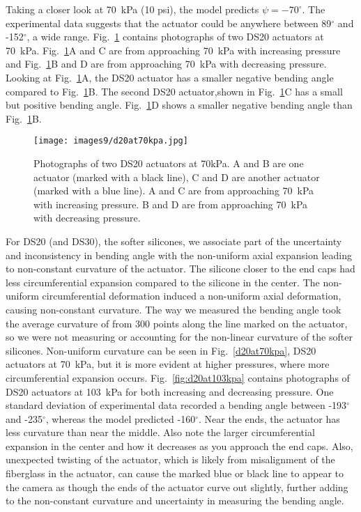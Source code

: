 Taking a closer look at 70~kPa (10 psi), the model predicts $\psi=-70^\circ$. The experimental data suggests that the actuator could be anywhere between 89$^\circ$ and -152$^\circ$, a wide range. Fig.~\ref{fig:d20at70kpa} contains photographs of two DS20 actuators at 70~kPa. Fig.~\ref{fig:d20at70kpa}A and C are from approaching 70~kPa with increasing pressure and Fig.~\ref{fig:d20at70kpa}B and D are from approaching 70~kPa with decreasing pressure. Looking at Fig.~\ref{fig:d20at70kpa}A, the DS20 actuator has a smaller negative bending angle compared to Fig.~\ref{fig:d20at70kpa}B. The second DS20 actuator,shown in Fig.~\ref{fig:d20at70kpa}C has a small but positive bending angle. Fig.~\ref{fig:d20at70kpa}D shows a smaller negative bending angle than Fig.~\ref{fig:d20at70kpa}B. 

\begin{figure}[ht]
    \centering
     \texttt{[image: images9/d20at70kpa.jpg]}
    \caption{Photographs of two DS20 actuators at 70kPa. A and B are one actuator (marked with a black line), C and D are another actuator (marked with a blue line). A and C are from approaching 70~kPa with increasing pressure. B and D are from approaching 70~kPa with decreasing pressure.}
    \label{fig:d20at70kpa}
\end{figure}

For DS20 (and DS30), the softer silicones, we associate part of the uncertainty and inconsistency in bending angle with the non-uniform axial expansion leading to non-constant curvature of the actuator. The silicone closer to the end caps had less circumferential expansion compared to the silicone in the center. The non-uniform circumferential deformation induced a non-uniform axial deformation, causing non-constant curvature. The way we measured the bending angle took the average curvature of from 300 points along the line marked on the actuator, so we were not measuring or accounting for the non-linear curvature of the softer silicones. Non-uniform curvature can be seen in Fig.~\ref{d20at70kpa}, DS20 actuators at 70~kPa, but it is more evident at higher pressures, where more circumferential expansion occurs. Fig.~\ref{fig:d20at103kpa} contains photographs of DS20 actuators at 103~kPa for both increasing and decreasing pressure. One standard deviation of experimental data recorded a bending angle between -193$^\circ$ and -235$^\circ$, whereas the model predicted -160$^\circ$. Near the ends, the actuator has less curvature than near the middle. Also note the larger circumferential expansion in the center and how it decreases as you approach the end caps. Also, unexpected twisting of the actuator, which is likely from misalignment of the fiberglass in the actuator, can cause the marked blue or black line to appear to the camera as though the ends of the actuator curve out slightly, further adding to the non-constant curvature and uncertainty in measuring the bending angle.

